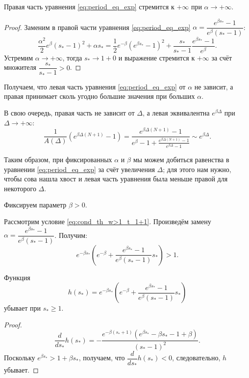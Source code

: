%
\begin{proposition}
	Правая часть уравнения \eqref{eq:period_eq_exp} стремится к $+\infty$ при $\alpha \to +\infty$.
\end{proposition}
\begin{proof}
	Заменим в правой части уравнения \eqref{eq:period_eq_exp} $\alpha = \dfrac{e^{\beta s_*} - 1}{e^{\beta}(s_* - 1)}$:
	\begin{equation}
		\dfrac{\alpha^2}{2}e^{\beta}( s_* - 1)^2 + \alpha s_* = \dfrac{1}{2}e^{-\beta}(e^{\beta s_*} - 1)^2 + \dfrac{s_*}{s_* - 1}\dfrac{e^{\beta s_*} - 1}{e^{\beta}}.
	\end{equation}
	Устремим $\alpha \to +\infty$, тогда $s_* \to 1 + 0$ и выражение стремится к $+\infty$ за счёт множителя $\dfrac{s_*}{s_* - 1} > 0$.
\end{proof}

Получаем, что левая часть уравнения \eqref{eq:period_eq_exp} от $\alpha$ не зависит, а правая принимает сколь угодно большие значения при больших $\alpha$.

В свою очередь, правая часть не зависит от $\Delta$, а левая эквивалентна $e^{\beta\Delta}$ при $\Delta \to +\infty$:
$$
\dfrac{1}{A(\Delta)}\left(e^{\beta\Delta(N + 1)} - 1\right) = \dfrac{e^{\beta\Delta(N + 1)} - 1}{e^{\beta} - 1 + \frac{e^{\beta\Delta(N + 1)} - 1}{e^{\beta\Delta} - 1}} \sim e^{\beta \Delta}.
$$

Таким образом, при фиксированных $\alpha$ и $\beta$ мы можем добиться равенства в уравнении \eqref{eq:period_eq_exp} за счёт увеличения $\Delta$; для этого нам нужно, чтобы сова нашла хвост и левая часть уравнения была меньше правой для некоторого $\Delta$.

Фиксируем параметр $\beta > 0$.

Рассмотрим условие \eqref{eq:cond_th_w>1_t_1+1}. Произведём замену $\alpha = \dfrac{e^{\beta s_*} - 1}{e^{\beta}(s_* - 1)}$. Получим: 
\begin{equation}
	e^{-\beta  s_*} \left(e^{-\beta} + \frac{e^{\beta s_*} - 1}{e^{\beta}(s_* - 1)}s_*\right) > 1.
\end{equation}
%

\begin{proposition}
	Функция 
	\begin{equation}
		h(s_*) = e^{-\beta  s_*} \left(e^{-\beta} + \frac{e^{\beta s_*} - 1}{e^{\beta}(s_* - 1)}s_*\right)
	\end{equation}
	убывает при $s_* \geqslant 1$.
\end{proposition}
%
\begin{proof}
	\begin{equation}
		\dfrac{d}{ds_*}h(s_*) = -\dfrac{e^{-\beta(s_* + 1)} (e^{\beta s_*} - \beta s_* - 1 + \beta)}{(s_* - 1)^2}.
	\end{equation}
	Поскольку $e^{\beta s_*} > 1 + \beta s_*$, получаем, что $\dfrac{d}{ds_*}h(s_*) < 0$, следовательно, $h$ убывает.
\end{proof}

